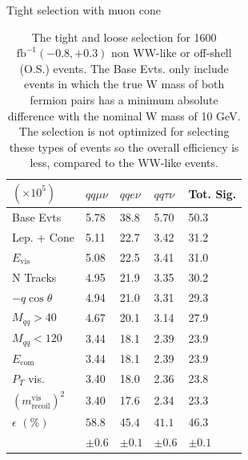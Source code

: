 \begin{table}
\centering
\caption{The tight and loose selection for 1600 $\text{fb}^{-1} (-0.8,+0.3)$ non WW-like or off-shell (O.S.) events.  The Base
Evts. only include events in which the true W mass of both fermion pairs has a minimum absolute difference
with the nominal W mass of 10 GeV. The selection is not optimized for selecting these types of events so the overall efficiency is less, compared to the WW-like events.}
\begin{minipage}{0.49\linewidth}
\scriptsize
 Tight selection with muon cone \\
\begin{tabular}{|p{}|p{}p{}p{}|p{}|}
\hline
  $(\times 10^5)$& $qq\mu\nu$ & $qqe\nu$ & $qq\tau\nu$ & Tot. Sig. \\ 
\hline
Base Evts &{5.78 } & {38.8 } & {5.70} & 50.3\\ 
 
Lep. + Cone &{5.11 } & {22.7 } & {3.42} & 31.2\\ 

$E_{\text{vis}}$ &{5.08 } & {22.5 } & {3.41} & 31.0\\ 

N Tracks &{4.95 } & {21.9 } & {3.35}& 30.2\\ 
 
$-q\cos\theta$ &{4.94 } & {21.0 } & {3.31}& 29.3\\ 
 
$M_{qq}>40$ &{4.67} & {20.1 } & {3.14} & 27.9\\ 
 
$M_{qq}<120$ &{3.44 } & {18.1 } & {2.39} & 23.9\\ 

$E_{\text{com}}$ &{3.44 } & {18.1 } & {2.39} & 23.9\\ 
 
$P_T$ vis. &{3.40 } & {18.0 } & {2.36} & 23.8\\ 
 
$(m^{\text{vis}}_{\text{recoil}})^2$ & {3.40 } & {17.6 } & {2.34}& 23.3\\ 
\hline 
 $\epsilon \, \, (\%)$ & $58.8$ & $45.4$ & $41.1$ & $46.3$ \\ 
 						& $\pm 0.6$ & $\pm 0.1$ & $\pm 0.6$ & $\pm 0.1$\\
 \hline
\end{tabular}
\end{minipage}



\end{table}
